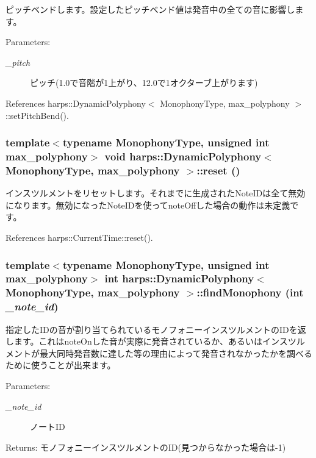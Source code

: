 ピッチベンドします。設定したピッチベンド値は発音中の全ての音に影響します。 \begin{Desc}
\item[Parameters:]
\begin{description}
\item[{\em \_\-pitch}]ピッチ(1.0で音階が1上がり、12.0で1オクターブ上がります) \end{description}
\end{Desc}


References harps::DynamicPolyphony$<$ MonophonyType, max\_\-polyphony $>$::setPitchBend().
\subsubsection[reset]{\setlength{\rightskip}{0pt plus 5cm}template$<$typename MonophonyType, unsigned int max\_\-polyphony$>$ void {\bf harps::DynamicPolyphony}$<$ MonophonyType, max\_\-polyphony $>$::reset ()\hspace{0.3cm}{\tt  [inline]}}\label{classharps_1_1DynamicPolyphony_a719ce61a5f7c106a8bcc896b9a5c167}


インスツルメントをリセットします。それまでに生成されたNoteIDは全て無効になります。無効になったNoteIDを使ってnoteOffした場合の動作は未定義です。 

References harps::CurrentTime::reset().
\subsubsection[findMonophony]{\setlength{\rightskip}{0pt plus 5cm}template$<$typename MonophonyType, unsigned int max\_\-polyphony$>$ int {\bf harps::DynamicPolyphony}$<$ MonophonyType, max\_\-polyphony $>$::findMonophony (int {\em \_\-note\_\-id})\hspace{0.3cm}{\tt  [inline]}}\label{classharps_1_1DynamicPolyphony_0db5c94c16f5babf60c2e47d02cb6f36}


指定したIDの音が割り当てられているモノフォニーインスツルメントのIDを返します。これはnoteOnした音が実際に発音されているか、あるいはインスツルメントが最大同時発音数に達した等の理由によって発音されなかったかを調べるために使うことが出来ます。 \begin{Desc}
\item[Parameters:]
\begin{description}
\item[{\em \_\-note\_\-id}]ノートID \end{description}
\end{Desc}
\begin{Desc}
\item[Returns:]モノフォニーインスツルメントのID(見つからなかった場合は-1) \end{Desc}


